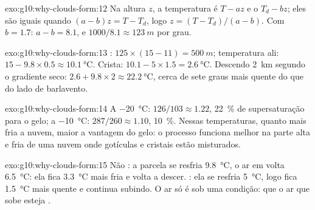 \begin{solution}{exo:g10:why-clouds-form:12}
Na altura $z$, a temperatura é $T - a z$ e o  $T_d - b z$;
eles são iguais quando $(a - b) z = T - T_d$, logo $z = (T - T_d)/(a - b)$.
Com $b = 1.7$: $a - b = 8.1$, e $1000/8.1 \approx \qty{123}{m}$ por grau.
\end{solution}

\begin{solution}{exo:g10:why-clouds-form:13}
: $125 \times (15 - 11) = \qty{500}{m}$; temperatura
ali: $15 - 9.8 \times 0.5 \approx \qty{10.1}{\degreeCelsius}$. Crista: $10.1 - 5
\times 1.5 = \qty{2.6}{\degreeCelsius}$. Descendo \qty{2}{km} segundo o
gradiente seco: $2.6 + 9.8 \times 2 \approx \qty{22.2}{\degreeCelsius}$,
cerca de sete graus mais quente do que do lado de barlavento.
\end{solution}

\begin{solution}{exo:g10:why-clouds-form:14}
A \qty{-20}{\degreeCelsius}: $126/103 \approx 1.22$, \qty{22}{\percent} de
supersaturação para o gelo; a \qty{-10}{\degreeCelsius}: $287/260 \approx
1.10$, \qty{10}{\percent}. Nessas temperaturas, quanto mais fria a nuvem,
maior a vantagem do gelo: o processo funciona melhor na parte alta e fria
de uma nuvem onde gotículas e cristais estão misturados.
\end{solution}

\begin{solution}{exo:g10:why-clouds-form:15}
Não : a parcela se resfria \qty{9.8}{\degreeCelsius}, o ar em volta
\qty{6.5}{\degreeCelsius}: ela fica \qty{3.3}{\degreeCelsius} mais fria e
volta a descer. : ela se resfria \qty{5}{\degreeCelsius}, logo fica
\qty{1.5}{\degreeCelsius} mais quente e continua subindo. O ar só é 
sob uma condição: que o ar que sobe esteja .
\end{solution}

